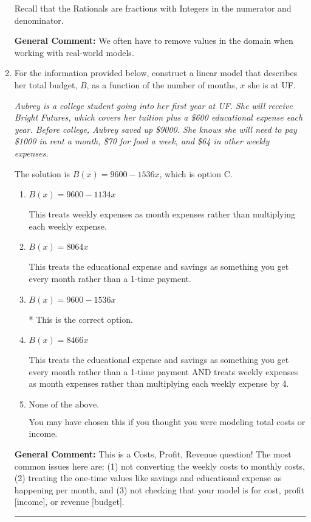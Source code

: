 \documentclass{extbook}[14pt]
\newcommand{\litem}[1]{\item #1

\rule{\textwidth}{0.4pt}}
\begin{document}
\begin{enumerate}
{\begin{enumerate}[label=\Alph*.]
Recall that the Rationals are fractions with Integers in the numerator and denominator.
\end{enumerate}

\textbf{General Comment:} We often have to remove values in the domain when working with real-world models.
}
\litem{
For the information provided below, construct a linear model that describes her total budget, $B$, as a function of the number of months, $x$ she is at UF.

\begin{center}
    \textit{ Aubrey is a college student going into her first year at UF. She will receive Bright Futures, which covers her tuition plus a \$600 educational expense each year. Before college, Aubrey saved up \$9000. She knows she will need to pay \$1000 in rent a month, \$70 for food a week, and \$64 in other weekly expenses. }
\end{center}
The solution is \( B(x) = 9600 - 1536 x \), which is option C.\begin{enumerate}[label=\Alph*.]
\item \( B(x) = 9600 - 1134 x \)

This treats weekly expenses as month expenses rather than multiplying each weekly expense.
\item \( B(x) = 8064 x \)

This treats the educational expense and savings as something you get every month rather than a 1-time payment.
\item \( B(x) = 9600 - 1536 x \)

* This is the correct option.
\item \( B(x) = 8466 x \)

This treats the educational expense and savings as something you get every month rather than a 1-time payment AND treats weekly expenses as month expenses rather than multiplying each weekly expense by 4.
\item \( \text{None of the above.} \)

You may have chosen this if you thought you were modeling total costs or income.
\end{enumerate}

\textbf{General Comment:} This is a Costs, Profit, Revenue question! The most common issues here are: (1) not converting the weekly costs to monthly costs, (2) treating the one-time values like savings and educational expense as happening per month, and (3) not checking that your model is for cost, profit [income], or revenue [budget].
}
\end{enumerate}
\end{document}
